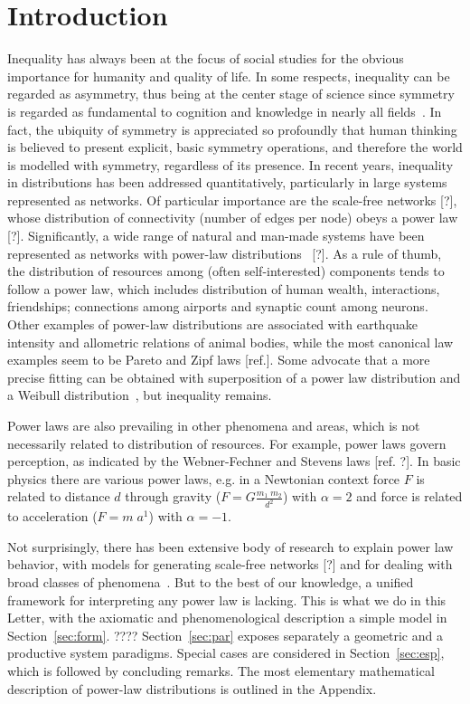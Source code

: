 \documentclass[a4paper, 11pt]{article} %
\begin{document}
\section{Introduction}
Inequality has always been at the focus of social studies for the obvious importance for humanity and quality of life. In some respects, inequality can be regarded as asymmetry, thus being at the center stage of science since symmetry is regarded as fundamental to cognition 
and knowledge in nearly all fields~\cite{deleuze,part}. In fact, the ubiquity of symmetry is appreciated so profoundly that human thinking is believed to present explicit, basic symmetry operations, and therefore the world is modelled with symmetry, regardless of its presence. In recent years, inequality in distributions has been addressed quantitatively, particularly in large systems represented as networks. Of particular importance are the scale-free networks [?], whose distribution of connectivity (number of edges per node) obeys a power law [?]. Significantly, a wide range of natural and man-made systems have been represented as networks with power-law distributions~\cite{newman} [?].    
As a rule of thumb, the distribution of resources among (often self-interested) components tends to follow a power law, which includes distribution of human wealth, interactions, friendships;
connections among airports and synaptic count among neurons. Other examples of power-law distributions are associated with earthquake intensity and allometric relations of animal bodies, while the most canonical law examples seem to be Pareto and Zipf laws [ref.].
Some advocate that a more precise fitting can be obtained with superposition of a power law distribution and a Weibull distribution~\cite{powWeib}, but inequality remains.

Power laws are also prevailing in other phenomena and areas, which is not necessarily related to distribution of resources. For example, power laws govern perception, as indicated by the Webner-Fechner and Stevens laws [ref. ?]. In basic physics there are various power laws, e.g. in a Newtonian context force $F$ is related to distance $d$ through gravity
($F=G\frac{m_1\;m_2}{d^2}$)
with $\alpha=2$ 
and force is related to acceleration
($F=m\;a^1$) 
with $\alpha=-1$.


Not surprisingly, there has been extensive body of research to explain power law behavior, with models for generating scale-free networks [?] and for dealing with broad classes of phenomena~\cite{part,pbook}. But to the best of our knowledge, a unified framework for interpreting any power law is lacking. This is what we do in this Letter, with the axiomatic and phenomenological description a simple model in Section~\ref{sec:form}. ???? 
Section~\ref{sec:par} exposes separately a geometric and a productive system
paradigms.
Special cases are considered in Section~\ref{sec:esp},
which is followed by concluding remarks.
The most elementary mathematical description 
of power-law distributions is outlined in the
Appendix.
\end{document}
